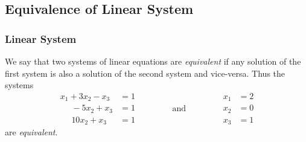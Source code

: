 \documentclass[12pt, t]{beamer}
\renewcommand{\emph}[1]{{\color{Turquoise3}\textsl{#1}}}
\begin{document}
\subsection{Equivalence of Linear System}
\begin{frame}
    \frametitle{Linear System}
    We say that two systems of linear equations are \emph{equivalent} if any solution
    of the first system is also a solution of the second system and vice-versa.
    Thus the systems
    \begin{equation*}
        \begin{aligned}
            x_1+3x_2-x_3    & =1 \\
            ~~~~~~-5x_2+x_3 & =1 \\
            ~~~~~~10x_2+x_3 & =1
        \end{aligned}
        \qquad\qquad\text{and}\qquad\qquad
        \begin{aligned}
            x_1 & =2 \\x_2&=0\\x_3&=1
        \end{aligned}
    \end{equation*} are \emph{equivalent}.
\end{frame}
\end{document}
